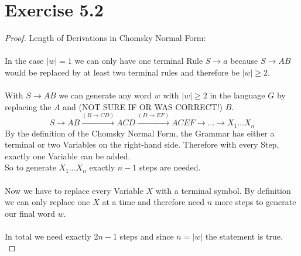\documentclass{article} %
\newcommand{\homeworkNumber}{5}
\begin{document}
\section*{Exercise \homeworkNumber.2}
\begin{proof}
Length of Derivations in Chomsky Normal Form:\\\\
In the case $\vert w \vert = 1$ we can only have one terminal Rule $ S \to a $ because $ S \to AB $ would be replaced by at least two terminal rules and therefore be $\vert w \vert \geq 2$. \\\\
With $ S \to AB $ we can generate any word $w$ with $\vert w \vert \geq 2$ in the language $G$ by replacing the $A$ and (NOT SURE IF OR WAS CORRECT!) $B$.
$$S \to AB \xrightarrow{(B \to CD)} ACD \xrightarrow{(D \to EF)} ACEF \to \dots \to X_1 \dots X_n$$
By the definition of the Chomsky Normal Form, the Grammar has either a terminal or two Variables on the right-hand side. Therefore with every Step, exactly one Variable can be added.\\
So to generate $X_1 \dots X_n$ exactly $n-1$ steps are needed.\\\\
Now we have to replace every Variable $X$ with a terminal symbol. By definition we can only replace one $X$ at a time and therefore need $n$ more steps to generate our final word $w$.\\\\
In total we need exactly $2n-1$ steps and since $n = \vert w \vert$ the statement is true.\\
\end{proof}
\end{document}
